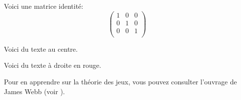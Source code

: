 \documentclass[11pt]{article}		            %
\theoremstyle{definition}                       %
\begin{document}
\newpage
    Voici une matrice identité:
    \[
        \begin{pmatrix}
         1    &0    & 0 \\
         0    & 1    & 0 \\
         0    & 0    & 1 \\
        \end{pmatrix}
    \]
    \begin{center}
        Voici du texte au centre.
    \end{center}
    \begin{flushright}
                {\color{red}Voici du texte à droite en rouge.}
    \end{flushright}
Pour en apprendre sur la théorie des jeux, vous pouvez consulter l'ouvrage de James Webb (voir \cite{Webb}).
\newpage
 

\end{document}

